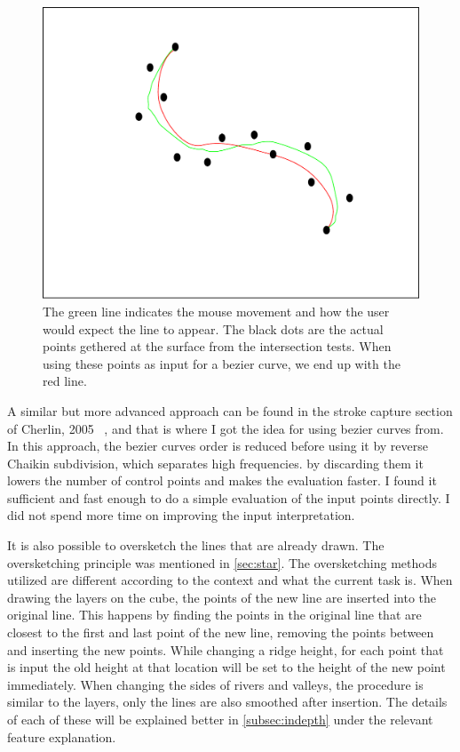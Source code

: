 \documentclass[a4paper,12pt]{report}
\newcommand{\secref}[1]{\autoref{#1}}
\begin{document}
\begin{figure}
 \includegraphics[width=\linewidth]{thesis/bezierSmooth.pdf}
 \caption{The green line indicates the mouse movement and how the user would expect the line to appear. The black dots are the actual points gethered at the surface from the intersection tests. When using these points as input for a bezier curve, we end up with the red line.}
 \label{fig:bezierSmooth}
\end{figure}


A similar but more advanced approach can be found in the stroke capture section of Cherlin, 2005 ~\cite{Cherlin:2005:SMF:1090122.1090145}, and that is where I got the idea for using bezier curves from. In this approach, the bezier curves order is reduced before using it by reverse Chaikin subdivision, which separates high frequencies. by discarding them it lowers the number of control points and makes the evaluation faster. I found it sufficient and fast enough to do a simple evaluation of the input points directly. I did not spend more time on improving the input interpretation.

It is also possible to oversketch the lines that are already drawn. The oversketching principle was mentioned in \secref{sec:star}. The oversketching methods utilized are different according to the context and what the current task is. When drawing the layers on the cube, the points of the new line are inserted into the original line. This happens by finding the points in the original line that are closest to the first and last point of the new line, removing the points between and inserting the new points. While changing a ridge height, for each point that is input the old height at that location will be set to the height of the new point immediately. When changing the sides of rivers and valleys, the procedure is similar to the layers, only the lines are also smoothed after insertion. The details of each of these will be explained better in \secref{subsec:indepth} under the relevant feature explanation.
\end{document}

